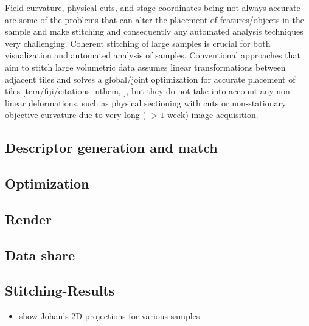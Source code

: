 \documentclass[../main.tex]{subfiles}
\begin{document}
Field curvature, physical cuts, and stage coordinates being not always accurate are some of the problems that can alter the placement of features/objects in the sample and make stitching and consequently any automated analysis techniques very challenging. Coherent stitching of large samples is crucial for both visualization and automated analysis of samples. Conventional approaches that aim to stitch large volumetric data assumes linear transformations between adjacent tiles and solves a global/joint optimization for accurate placement of tiles [tera/fiji/citations inthem, \cite{tsai2011robust, chalfoun2017mist,bria2012terastitcher,emmenlauer2009xuvtools} ], but they do not take into account any non-linear deformations, such as physical sectioning with cuts or non-stationary objective curvature due to very long ( $> 1$ week) image acquisition. 



\subsection{Descriptor generation and match}
\subsection{Optimization}
\subsection{Render}
\subsection{Data share}
\subsection{Stitching-Results}
\begin{itemize}
\item show Johan's 2D projections for various samples
\end{itemize}

\end{document}
